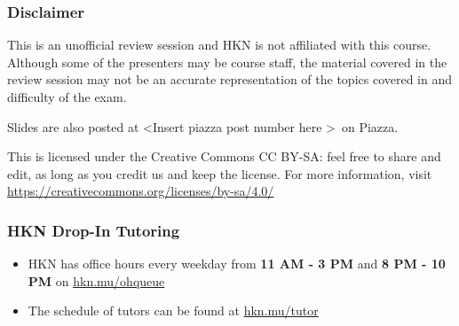 \providecommand{\SlideAccessingLogistics}{\textless Insert piazza post number here \textgreater}
\providecommand{\SlidesLocation}{\textless Slides location and/or link \textgreater}
\providecommand{\PresenterHours}{\textless Itemize the presenter hours here \textgreater}

\begin{frame}

\titlepage

\end{frame}

\begin{frame}[t]\vspace{20pt}
\frametitle{Disclaimer}
This is an unofficial review session and HKN is not affiliated with this course. Although some of the presenters may be course staff, the material covered in the review session may not be an accurate representation of the topics covered in and difficulty of the exam.


Slides are also posted at \SlideAccessingLogistics\ on Piazza.

\begin{footnotesize}
  This is licensed under the Creative Commons CC BY-SA: feel free to share and edit, as long as you credit us and keep the license. For more information, visit
  \href{https://creativecommons.org/licenses/by-sa/4.0/}{https://creativecommons.org/licenses/by-sa/4.0/}
\end{footnotesize}

\vspace{20pt}

\end{frame}


\begin{frame}[t]\vspace{20pt}
\frametitle{HKN Drop-In Tutoring}

\begin{itemize}
  \item HKN has office hours every weekday from \textbf{11 AM - 3 PM} and \textbf{8 PM - 10 PM} on \href{https://hkn.mu/ohqueue}{hkn.mu/ohqueue}
  \item The schedule of tutors can be found at \href{https://hkn.mu/tutor}{hkn.mu/tutor}
\end{itemize}

\end{frame}
